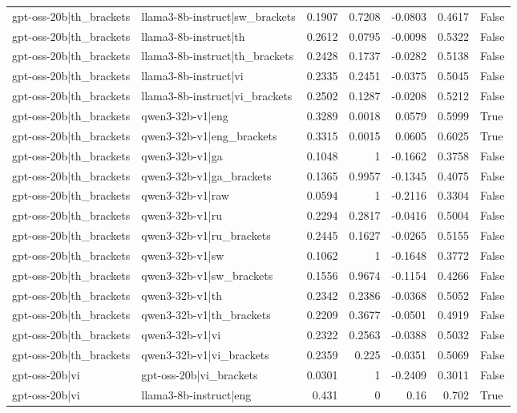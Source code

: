\begin{table}
\begin{tabular}{l l r r r r l}
gpt-oss-20b|th_brackets & llama3-8b-instruct|sw_brackets & 0.1907 & 0.7208 & -0.0803 & 0.4617 & False \\
gpt-oss-20b|th_brackets & llama3-8b-instruct|th & 0.2612 & 0.0795 & -0.0098 & 0.5322 & False \\
gpt-oss-20b|th_brackets & llama3-8b-instruct|th_brackets & 0.2428 & 0.1737 & -0.0282 & 0.5138 & False \\
gpt-oss-20b|th_brackets & llama3-8b-instruct|vi & 0.2335 & 0.2451 & -0.0375 & 0.5045 & False \\
gpt-oss-20b|th_brackets & llama3-8b-instruct|vi_brackets & 0.2502 & 0.1287 & -0.0208 & 0.5212 & False \\
gpt-oss-20b|th_brackets & qwen3-32b-v1|eng & 0.3289 & 0.0018 & 0.0579 & 0.5999 & True \\
gpt-oss-20b|th_brackets & qwen3-32b-v1|eng_brackets & 0.3315 & 0.0015 & 0.0605 & 0.6025 & True \\
gpt-oss-20b|th_brackets & qwen3-32b-v1|ga & 0.1048 & 1 & -0.1662 & 0.3758 & False \\
gpt-oss-20b|th_brackets & qwen3-32b-v1|ga_brackets & 0.1365 & 0.9957 & -0.1345 & 0.4075 & False \\
gpt-oss-20b|th_brackets & qwen3-32b-v1|raw & 0.0594 & 1 & -0.2116 & 0.3304 & False \\
gpt-oss-20b|th_brackets & qwen3-32b-v1|ru & 0.2294 & 0.2817 & -0.0416 & 0.5004 & False \\
gpt-oss-20b|th_brackets & qwen3-32b-v1|ru_brackets & 0.2445 & 0.1627 & -0.0265 & 0.5155 & False \\
gpt-oss-20b|th_brackets & qwen3-32b-v1|sw & 0.1062 & 1 & -0.1648 & 0.3772 & False \\
gpt-oss-20b|th_brackets & qwen3-32b-v1|sw_brackets & 0.1556 & 0.9674 & -0.1154 & 0.4266 & False \\
gpt-oss-20b|th_brackets & qwen3-32b-v1|th & 0.2342 & 0.2386 & -0.0368 & 0.5052 & False \\
gpt-oss-20b|th_brackets & qwen3-32b-v1|th_brackets & 0.2209 & 0.3677 & -0.0501 & 0.4919 & False \\
gpt-oss-20b|th_brackets & qwen3-32b-v1|vi & 0.2322 & 0.2563 & -0.0388 & 0.5032 & False \\
gpt-oss-20b|th_brackets & qwen3-32b-v1|vi_brackets & 0.2359 & 0.225 & -0.0351 & 0.5069 & False \\
gpt-oss-20b|vi & gpt-oss-20b|vi_brackets & 0.0301 & 1 & -0.2409 & 0.3011 & False \\
gpt-oss-20b|vi & llama3-8b-instruct|eng & 0.431 & 0 & 0.16 & 0.702 & True \\

\end{tabular}
\end{table}
